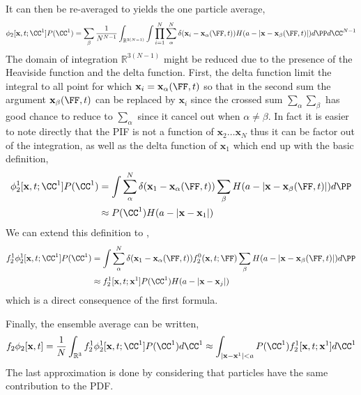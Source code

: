 It can then be re-averaged to yields the one particle average, 
\begin{equation}
    \phi_2[\textbf{x},t;\CC^1]P(\CC^1)
    =     
    \sum_\beta
    \frac{1}{N^{N-1}}
    \int_{\mathbb{R}^{3(N-1)}} 
    \int 
    \prod_{i=1}^{N}\sum_{\alpha}^{N}\delta(\textbf{x}_i - \textbf{x}_\alpha(\FF,t)) 
    H(a - |\textbf{x} -\textbf{x}_\beta(\FF,t)|)
    d\PP
    d\CC^{N-1}
\end{equation}
The domain of integration $\mathbb{R}^{3(N-1)}$ might be reduced due to the presence of the Heaviside function and the delta function. 
First, the delta function limit the integral to all point for which $\textbf{x}_i = \textbf{x}_\alpha(\FF,t)$ so that in the second sum the argument $\textbf{x}_\beta(\FF,t)$ can be replaced by $\textbf{x}_i$ since the crossed sum $\sum_\alpha\sum_\beta$ has good chance to reduce to $\sum_\alpha$ since it cancel out when $\alpha\neq\beta$. 
In fact it is easier to note directly that the PIF is not a function of $\textbf{x}_2\ldots\textbf{x}_{N}$ thus it can be factor out of the integration, as well as the delta function of $\textbf{x}_1$ which end up with the basic definition, 
\begin{align*}
    \phi_2^1[\textbf{x},t;\CC^1]P(\CC^1)
    &=     
    \int 
    \sum_{\alpha}^{N}\delta(\textbf{x}_1 - \textbf{x}_\alpha(\FF,t)) 
    \sum_\beta
    H(a - |\textbf{x} -\textbf{x}_\beta(\FF,t)|)
    d\PP\\
    &\approx
    P(\CC^1) 
     H(a - |\textbf{x} - \textbf{x}_1|)
\end{align*}
We can extend this definition to ,
\begin{align*}
    f_2^1\phi_2^1[\textbf{x},t;\CC^1]P(\CC^1)
    &=     
    \int 
    \sum_{\alpha}^{N}\delta(\textbf{x}_1 - \textbf{x}_\alpha(\FF,t)) 
    f_2^0(\textbf{x},t;\FF)
    \sum_\beta 
    H(a - |\textbf{x} -\textbf{x}_\beta(\FF,t)|) 
    d\PP\\
    &
    \approx
    f^1_2[\textbf{x},t;\textbf{x}^1]
    P(\CC^1)  H(a - |\textbf{x} - \textbf{x}_j|)
\end{align*}
which is a direct consequence of the first formula. 

Finally, the ensemble average can be written,  
\begin{equation}
    f_2\phi_2[\textbf{x},t]
    =\frac{1}{N} 
    \int_{\mathbb{R}^3} 
    f^1_2\phi_2^1[\textbf{x},t;\CC^1]
    P(\CC^1)
    d\CC^1
    \approx
    \int_{|\textbf{x} - \textbf{x}^1| < a} 
    P(\CC^1)
    f_2^1[\textbf{x},t;\textbf{x}^1]
    d\CC^1
\end{equation}
The last approximation is done by considering that particles have the same contribution to the PDF. 

